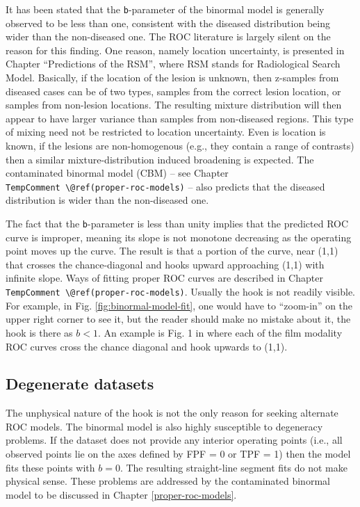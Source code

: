 \documentclass[
]{book}
\begin{document}
It has been stated that the \texttt{b}-parameter of the binormal model is generally observed to be less than one, consistent with the diseased distribution being wider than the non-diseased one. The ROC literature is largely silent on the reason for this finding. One reason, namely location uncertainty, is presented in Chapter ``Predictions of the RSM'', where RSM stands for Radiological Search Model. Basically, if the location of the lesion is unknown, then z-samples from diseased cases can be of two types, samples from the correct lesion location, or samples from non-lesion locations. The resulting mixture distribution will then appear to have larger variance than samples from non-diseased regions. This type of mixing need not be restricted to location uncertainty. Even is location is known, if the lesions are non-homogenous (e.g., they contain a range of contrasts) then a similar mixture-distribution induced broadening is expected. The contaminated binormal model (CBM) -- see Chapter \texttt{TempComment\ \textbackslash{}@ref(proper-roc-models)} -- also predicts that the diseased distribution is wider than the non-diseased one.

The fact that the \texttt{b}-parameter is less than unity implies that the predicted ROC curve is improper, meaning its slope is not monotone decreasing as the operating point moves up the curve. The result is that a portion of the curve, near (1,1) that crosses the chance-diagonal and hooks upward approaching (1,1) with infinite slope. Ways of fitting proper ROC curves are described in Chapter \texttt{TempComment\ \textbackslash{}@ref(proper-roc-models)}. Usually the hook is not readily visible. For example, in Fig. \ref{fig:binormal-model-fit}, one would have to ``zoom-in'' on the upper right corner to see it, but the reader should make no mistake about it, the hook is there as \(b < 1\). An example is Fig. 1 in \citep{pisano2005diagnostic} where each of the film modality ROC curves cross the chance diagonal and hook upwards to (1,1).

\hypertarget{binormal-model-degenerate-datasets}{%
\subsection{Degenerate datasets}\label{binormal-model-degenerate-datasets}}

The unphysical nature of the hook is not the only reason for seeking alternate ROC models. The binormal model is also highly susceptible to degeneracy problems. If the dataset does not provide any interior operating points (i.e., all observed points lie on the axes defined by FPF = 0 or TPF = 1) then the model fits these points with \(b = 0\). The resulting straight-line segment fits do not make physical sense. These problems are addressed by the contaminated binormal model to be discussed in Chapter \ref{proper-roc-models}.
\end{document}
